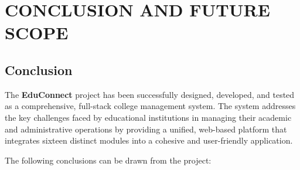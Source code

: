 \clearpage
\section{CONCLUSION AND FUTURE SCOPE}
\hline

\subsection{Conclusion}

The \textbf{EduConnect} project has been successfully designed, developed, and tested as a comprehensive, full-stack college management system. The system addresses the key challenges faced by educational institutions in managing their academic and administrative operations by providing a unified, web-based platform that integrates sixteen distinct modules into a cohesive and user-friendly application.

The following conclusions can be drawn from the project:

